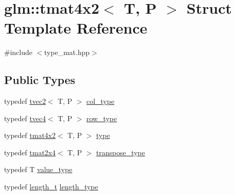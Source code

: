 \hypertarget{structglm_1_1tmat4x2}{}\section{glm\+::tmat4x2$<$ T, P $>$ Struct Template Reference}
\label{structglm_1_1tmat4x2}


{\ttfamily \#include $<$type\+\_\+mat.\+hpp$>$}

\subsection*{Public Types}
\begin{DoxyCompactItemize}
\item 
typedef \mbox{\hyperlink{structglm_1_1tvec2}{tvec2}}$<$ T, P $>$ \mbox{\hyperlink{structglm_1_1tmat4x2_ac775231a890f4ea29cd0073670309b3a}{col\+\_\+type}}
\item 
typedef \mbox{\hyperlink{structglm_1_1tvec4}{tvec4}}$<$ T, P $>$ \mbox{\hyperlink{structglm_1_1tmat4x2_a3bef891d2ec9d87bc5ada0602ad3122f}{row\+\_\+type}}
\item 
typedef \mbox{\hyperlink{structglm_1_1tmat4x2}{tmat4x2}}$<$ T, P $>$ \mbox{\hyperlink{structglm_1_1tmat4x2_a92c6e11d269f4f72087d8152689f16f1}{type}}
\item 
typedef \mbox{\hyperlink{structglm_1_1tmat2x4}{tmat2x4}}$<$ T, P $>$ \mbox{\hyperlink{structglm_1_1tmat4x2_a5eede582c47564806cff64584a24726c}{transpose\+\_\+type}}
\item 
typedef T \mbox{\hyperlink{structglm_1_1tmat4x2_a1a84490287435bbc6746b250e03169f5}{value\+\_\+type}}
\item 
typedef \mbox{\hyperlink{namespaceglm_a090a0de2260835bee80e71a702492ed9}{length\+\_\+t}} \mbox{\hyperlink{structglm_1_1tmat4x2_a28aaf36ee36edef6715c1fae6874f530}{length\+\_\+type}}
\end{DoxyCompactItemize}
